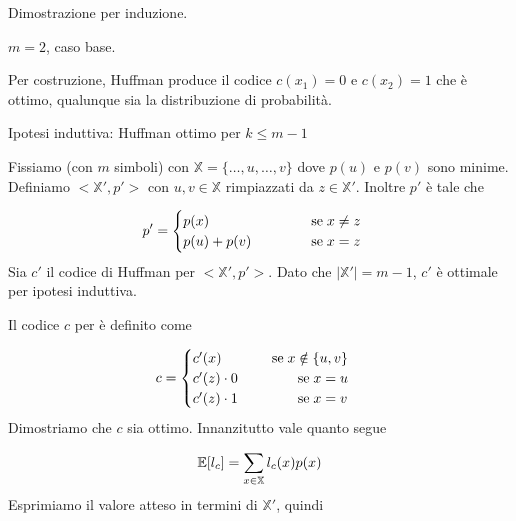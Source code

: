 \documentclass[12pt]{report}
\begin{document}
    \begin{dimo}
        Dimostrazione per induzione.

        \vspace{5px}

        \noindent
        $m=2$, caso base.

        \vspace{5px}

        \noindent
        Per costruzione, Huffman produce il codice $c(x_1) = 0$ e $c(x_2) = 1$ che è ottimo, qualunque sia la distribuzione di probabilità.

        \vspace{5px}

        \noindent
        Ipotesi induttiva: Huffman ottimo per $k\leq m-1$

        \vspace{5px}

        \noindent
        Fissiamo \modello (con $m$ simboli) con $\mathbb{X} = \{\dots,u,\dots,v\}$ dove $p(u)$ e $p(v)$ sono minime. Definiamo  $<\! \mathbb{X}',p'\!>$ con $u,v \in \mathbb{X}$ rimpiazzati da $z \in \mathbb{X}'$.  Inoltre $p'$ è tale che

        $$ p' = \begin{cases}
                    p(x) \hfill \;\text{se}\;x\neq z \\
                    p(u)+p(v) \hspace{40px} \; \text{se} \; x = z
        \end{cases}$$
        Sia $c'$ il codice di Huffman per $<\! \mathbb{X}',p'\!>$. Dato che $|\mathbb{X}'| = m-1$, $c'$ è ottimale per ipotesi induttiva.

        \noindent
        Il codice $c$ per \sorgente è definito come

        $$ c = \begin{cases}
                   c'(x) \hfill \;\text{se}\;x \notin \{u,v\}\\
                   c'(z) \cdot 0 \hspace{40px} \; \text{se} \; x = u \\
                   c'(z) \cdot 1 \hspace{40px} \; \text{se} \; x = v
        \end{cases}$$
        Dimostriamo che $c$ sia ottimo. Innanzitutto vale quanto segue

        $$\mathbb{E}[l_c] = \sum_{x \in \mathbb{X}} l_c(x) p(x)$$
        Esprimiamo il valore atteso in termini di $\mathbb{X'}$, quindi


\end{dimo}
\end{document}
